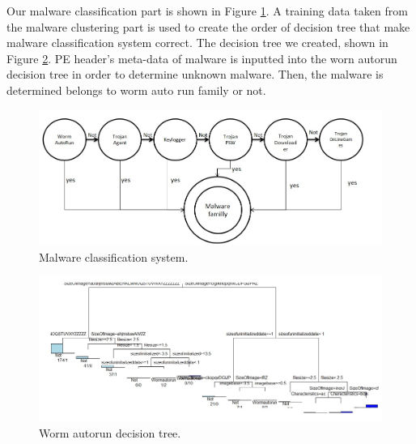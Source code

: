 Our malware classification part is shown in Figure \ref{fig:classification}. A training data taken from the malware clustering part is used to create the order of decision tree that make malware classification system correct.
The decision tree we created, shown in Figure \ref{fig:decisiontreeworm}. PE header's meta-data of malware is inputted into the worn autorun decision tree in order to determine unknown malware. Then, the malware is determined belongs to worm auto run family or not.\\
\begin{figure}[h!]
\centering
\includegraphics[width=1\textwidth]{graph/classification.jpg}
\caption{Malware classification system.}
\label{fig:classification}
\end{figure}
\begin{figure}[h!]
\centering
\includegraphics[width=1\textwidth]{graph/decisiontreeworm.jpg}
\caption{Worm autorun decision tree.}
\label{fig:decisiontreeworm}
\end{figure}
